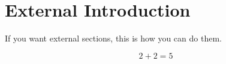 \section{External Introduction}

If you want external sections, this is how you can do them.

\begin{equation}
2+2=5
\end{equation}
